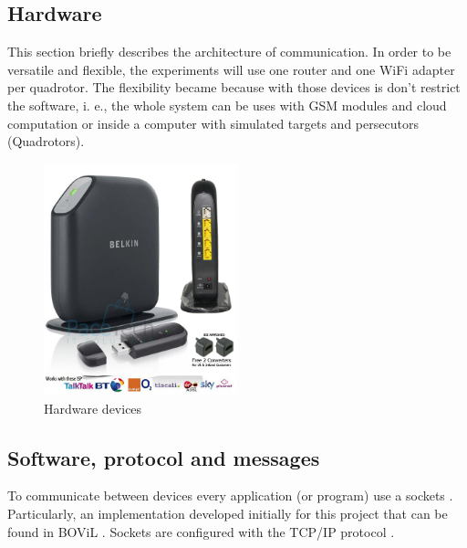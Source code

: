 \subsection{Hardware}
This section briefly describes the architecture of communication. In order to be versatile and flexible, the experiments will use one router and one WiFi adapter per quadrotor. The flexibility became because with those devices is don't restrict the software, i. e., the whole system can be uses with GSM modules and cloud computation or inside a computer with simulated targets and persecutors (Quadrotors).


\begin{figure}[h]
	\begin{center}
		\includegraphics[width=0.5\textwidth]{../Images/c2/hardware_comm.jpg}
	\end{center}
	\caption{Hardware devices}
	\label{fig:hardware_comm}
\end{figure}

\subsection{Software, protocol and messages}

To communicate between devices every application (or program) use a sockets \cite{SocketWiki}. Particularly, an implementation developed initially for this project that can be found in BOViL \cite{BOViL}. Sockets are configured with the TCP/IP protocol \cite{TCPIP}.


